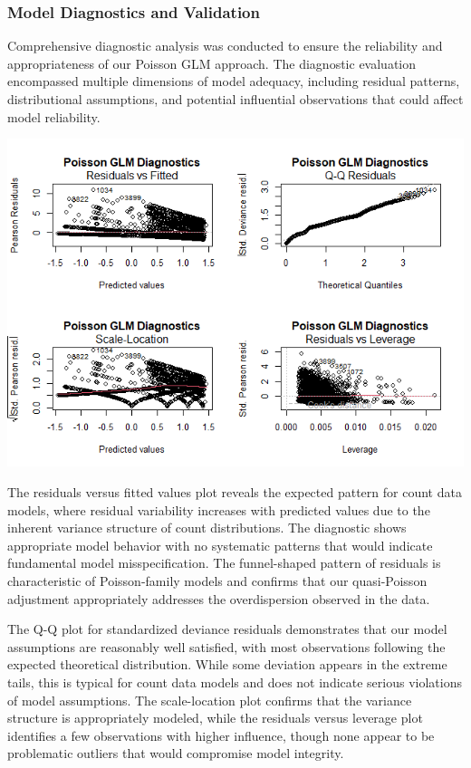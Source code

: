 \documentclass[
]{article}
\begin{document}
\hypertarget{model-diagnostics-and-validation}{%
\subsubsection{Model Diagnostics and
Validation}\label{model-diagnostics-and-validation}}

Comprehensive diagnostic analysis was conducted to ensure the
reliability and appropriateness of our Poisson GLM approach. The
diagnostic evaluation encompassed multiple dimensions of model adequacy,
including residual patterns, distributional assumptions, and potential
influential observations that could affect model reliability.

\begin{center}\includegraphics[width=0.8\linewidth]{Plots/poisson_diagnostics} \end{center}

The residuals versus fitted values plot reveals the expected pattern for
count data models, where residual variability increases with predicted
values due to the inherent variance structure of count distributions.
The diagnostic shows appropriate model behavior with no systematic
patterns that would indicate fundamental model misspecification. The
funnel-shaped pattern of residuals is characteristic of Poisson-family
models and confirms that our quasi-Poisson adjustment appropriately
addresses the overdispersion observed in the data.

The Q-Q plot for standardized deviance residuals demonstrates that our
model assumptions are reasonably well satisfied, with most observations
following the expected theoretical distribution. While some deviation
appears in the extreme tails, this is typical for count data models and
does not indicate serious violations of model assumptions. The
scale-location plot confirms that the variance structure is
appropriately modeled, while the residuals versus leverage plot
identifies a few observations with higher influence, though none appear
to be problematic outliers that would compromise model integrity.
\end{document}
